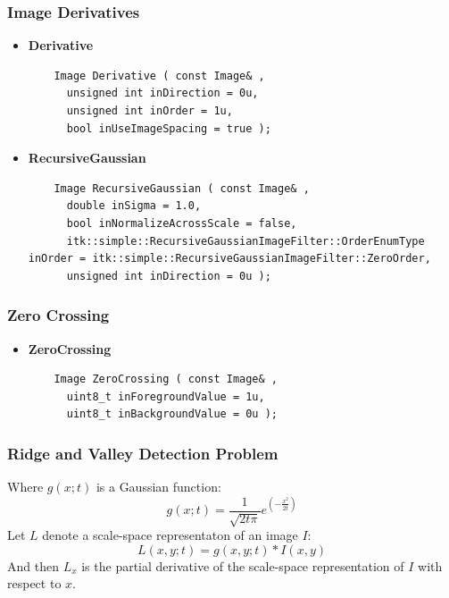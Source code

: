 \begin{frame}[fragile]
\frametitle{Image Derivatives}

\begin{itemize}
  \item {\bf Derivative}
\begin{lstlisting}
    Image Derivative ( const Image& ,
      unsigned int inDirection = 0u,
      unsigned int inOrder = 1u,
      bool inUseImageSpacing = true );
\end{lstlisting}
  \item {\bf RecursiveGaussian}
\begin{lstlisting}
    Image RecursiveGaussian ( const Image& ,
      double inSigma = 1.0,
      bool inNormalizeAcrossScale = false,
      itk::simple::RecursiveGaussianImageFilter::OrderEnumType inOrder = itk::simple::RecursiveGaussianImageFilter::ZeroOrder,
      unsigned int inDirection = 0u );
\end{lstlisting}
\end{itemize}

\end{frame}

\begin{frame}[fragile]
\frametitle{Zero Crossing}
  

\begin{itemize}
  \item {\bf ZeroCrossing }
\begin{lstlisting}
    Image ZeroCrossing ( const Image& ,
      uint8_t inForegroundValue = 1u,
      uint8_t inBackgroundValue = 0u );
\end{lstlisting}
\end{itemize}

\end{frame}


\begin{frame}[fragile]
\frametitle{Ridge and Valley Detection Problem}

Where $g(x;t)$ is a Gaussian function:\\
\center
\begin{equation}
g(x;t) = \frac{ 1 }{ \sqrt{ 2 t \pi } } e^{ \left( - \frac{x^2}{ 2 t} \right) }
\end{equation}
Let $L$ denote a scale-space representaton of an image $I$:\\
\begin{equation}
L(x,y;t) = g(x,y; t) \ast I(x,y)
\end{equation}
And then $L_x$ is the partial derivative of the scale-space
representation of $I$ with respect  to $x$. 
\end{frame}

